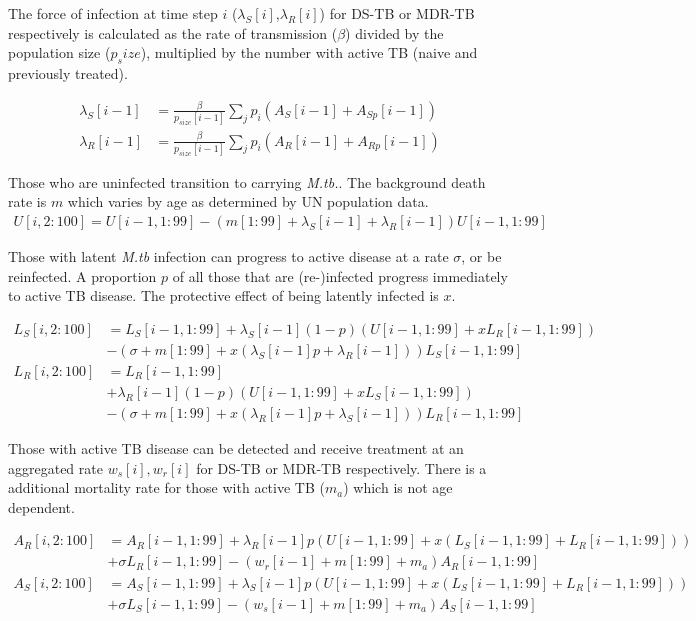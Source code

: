 \documentclass{article}
\begin{document}
The force of infection at time step $i$ ($\lambda_S[i]$,$\lambda_R[i]$) for DS-TB or MDR-TB respectively is calculated as the rate of transmission ($\beta$) divided by the population size ($p_size$), multiplied by the number with active TB (naive and previously treated).  

\begin{align}
\lambda_S[i-1] &= \frac{\beta}{p_{size}[i-1]} \sum_{j}{p_i (A_S[i-1] + A_{Sp}[i-1])} \\
\lambda_R[i-1] &= \frac{\beta}{p_{size}[i-1]} \sum_{j}{p_i (A_R[i-1] + A_{Rp}[i-1])} 
\end{align}

Those who are uninfected transition to carrying \textit{M.tb.}. The background death rate is $m$ which varies by age as determined by UN population data. 
\begin{align}
U[i,2:100] = U[i-1,1:99] - (m[1:99]+\lambda_S[i-1]+\lambda_R[i-1])U[i-1,1:99]
\end{align}

Those with latent \textit{M.tb} infection can progress to active disease at a rate $\sigma$, or be reinfected. A proportion $p$ of all those that are (re-)infected progress immediately to active TB disease. The protective effect of being latently infected is $x$. 

\begin{equation}
\begin{split}
L_S[i,2:100] &= L_S[i-1,1:99] + \lambda_S[i-1](1 - p)(U[i-1,1:99] + xL_R[i-1,1:99]) \\ &- (\sigma + m[1:99] + x(\lambda_S[i-1]p + \lambda_R[i-1]) )L_S[i-1,1:99] \\
L_R[i,2:100] &= L_R[i-1,1:99] \\ &+ \lambda_R[i-1](1 - p)(U[i-1,1:99] + xL_S[i-1,1:99]) \\ &- (\sigma + m[1:99] + x(\lambda_R[i-1]p + \lambda_S[i-1]))L_R[i-1,1:99]
\end{split}
\end{equation}

Those with active TB disease can be detected and receive treatment at an aggregated rate $w_s[i], w_r[i]$ for DS-TB or MDR-TB respectively. There is a additional mortality rate for those with active TB ($m_a$) which is not age dependent. 

\begin{equation}
\begin{split}
A_R[i,2:100] &= A_R[i-1,1:99] + \lambda_R[i-1]p( U[i-1,1:99] + x(L_S[i-1,1:99] + L_R[i-1,1:99]) ) \\ &+ \sigma L_R[i-1,1:99] 
     - (w_r[i-1] + m[1:99
] + m_a) A_R[i-1,1:99] \\
A_S[i,2:100] &= A_S[i-1,1:99] + \lambda_S[i-1] p ( U[i-1,1:99] + x(L_S[i-1,1:99] + L_R[i-1,1:99]) ) \\ &+ \sigma  L_S[i-1,1:99] 
     - (w_s[i-1] + m[1:99
] + m_a) A_S[i-1,1:99] 
\end{split}
\end{equation} 
\end{document}
